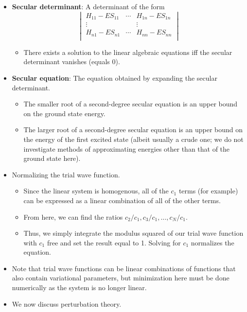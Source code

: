 \documentclass[../notes.tex]{subfiles}
\begin{document}
\begin{itemize}
    \item \textbf{Secular determinant}: A determinant of the form
    \begin{equation*}
        \begin{vmatrix}
            H_{11}-ES_{11} & \cdots & H_{1n}-ES_{1n}\\
            \vdots &  & \vdots\\
            H_{n1}-ES_{n1} & \cdots & H_{nn}-ES_{nn}\\
        \end{vmatrix}
    \end{equation*}
    \begin{itemize}
        \item There exists a solution to the linear algebraic equations iff the secular determinant vanishes (equals 0).
    \end{itemize}
    \item \textbf{Secular equation}: The equation obtained by expanding the secular determinant.
    \begin{itemize}
        \item The smaller root of a second-degree secular equation is an upper bound on the ground state energy.
        \item The larger root of a second-degree secular equation is an upper bound on the energy of the first excited state (albeit usually a crude one; we do not investigate methods of approximating energies other than that of the ground state here).
    \end{itemize}
    \item Normalizing the trial wave function.
    \begin{itemize}
        \item Since the linear system is homogenous, all of the $c_1$ terms (for example) can be expressed as a linear combination of all of the other terms.
        \item From here, we can find the ratios $c_2/c_1,c_3/c_1,\dots,c_N/c_1$.
        \item Thus, we simply integrate the modulus squared of our trial wave function with $c_1$ free and set the result equal to 1. Solving for $c_1$ normalizes the equation.
    \end{itemize}
    \item Note that trial wave functions can be linear combinations of functions that also contain variational parameters, but minimization here must be done numerically as the system is no longer linear.
    \item We now discuss perturbation theory.

\end{itemize}
\end{document}
